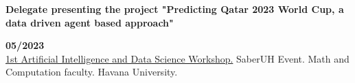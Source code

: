 \begin{minipage}{0.8\textwidth}
    \parbox{0.8\linewidth}{\textbf{Delegate presenting the project "Predicting Qatar 2023 World Cup, a data driven agent based approach" }} \hfill \textbf{05/2023}\\
    \hyperref[sec:workshop]{1st Artificial Intelligence and Data Science Workshop.} SaberUH Event. Math and Computation faculty. Havana University.\\
\end{minipage} \\